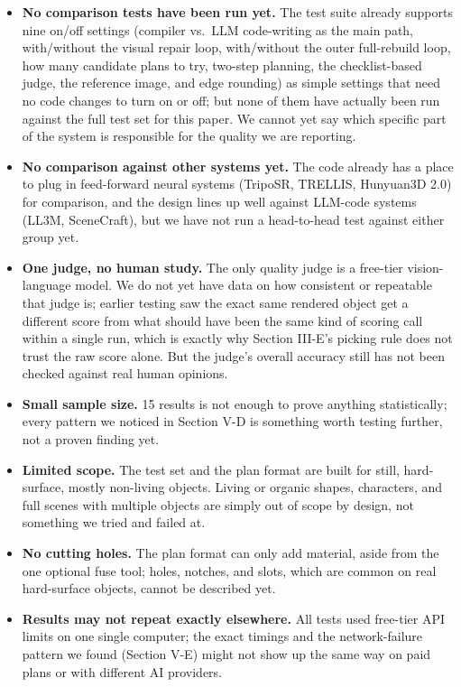 \documentclass[conference]{IEEEtran}
\begin{document}
\begin{itemize}
\item \textbf{No comparison tests have been run yet.} The test suite already supports nine on/off settings (compiler vs.\ LLM code-writing as the main path, with/without the visual repair loop, with/without the outer full-rebuild loop, how many candidate plans to try, two-step planning, the checklist-based judge, the reference image, and edge rounding) as simple settings that need no code changes to turn on or off; but none of them have actually been run against the full test set for this paper. We cannot yet say which specific part of the system is responsible for the quality we are reporting.
\item \textbf{No comparison against other systems yet.} The code already has a place to plug in feed-forward neural systems (TripoSR, TRELLIS, Hunyuan3D 2.0) for comparison, and the design lines up well against LLM-code systems (LL3M, SceneCraft), but we have not run a head-to-head test against either group yet.
\item \textbf{One judge, no human study.} The only quality judge is a free-tier vision-language model. We do not yet have data on how consistent or repeatable that judge is; earlier testing saw the exact same rendered object get a different score from what should have been the same kind of scoring call within a single run, which is exactly why Section III-E's picking rule does not trust the raw score alone. But the judge's overall accuracy still has not been checked against real human opinions.
\item \textbf{Small sample size.} 15 results is not enough to prove anything statistically; every pattern we noticed in Section V-D is something worth testing further, not a proven finding yet.
\item \textbf{Limited scope.} The test set and the plan format are built for still, hard-surface, mostly non-living objects. Living or organic shapes, characters, and full scenes with multiple objects are simply out of scope by design, not something we tried and failed at.
\item \textbf{No cutting holes.} The plan format can only add material, aside from the one optional fuse tool; holes, notches, and slots, which are common on real hard-surface objects, cannot be described yet.
\item \textbf{Results may not repeat exactly elsewhere.} All tests used free-tier API limits on one single computer; the exact timings and the network-failure pattern we found (Section V-E) might not show up the same way on paid plans or with different AI providers.
\end{itemize}
\end{document}
